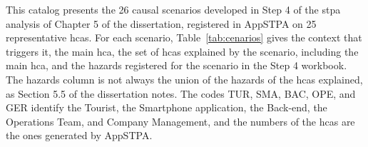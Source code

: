 \label{apx:cenarios}

This catalog presents the 26 causal scenarios developed in Step 4 of the \gls{stpa} analysis of Chapter 5 of the dissertation, registered in AppSTPA on 25 representative \glspl{hca}. For each scenario, Table~\ref{tab:cenarios} gives the context that triggers it, the main \gls{hca}, the set of \glspl{hca} explained by the scenario, including the main \gls{hca}, and the hazards registered for the scenario in the Step 4 workbook. The hazards column is not always the union of the hazards of the \glspl{hca} explained, as Section 5.5 of the dissertation notes. The codes TUR, SMA, BAC, OPE, and GER identify the Tourist, the Smartphone application, the Back-end, the Operations Team, and Company Management, and the numbers of the \glspl{hca} are the ones generated by AppSTPA.

